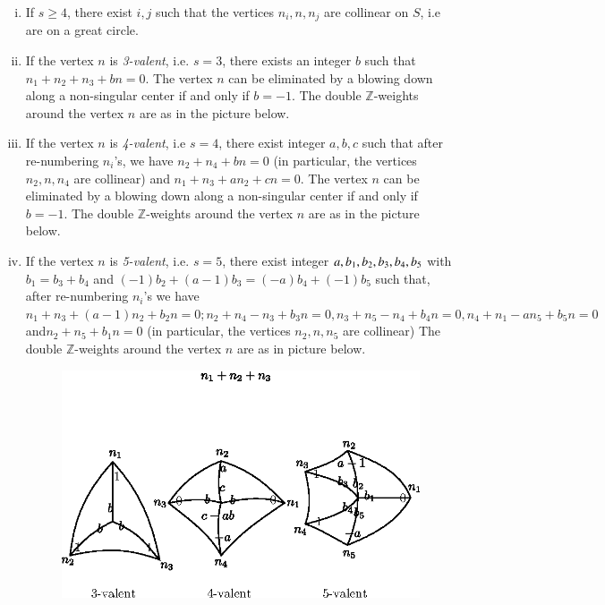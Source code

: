 \begin{enumerate}[(i)]
\item If $ s \ge 4$, there exist $i,j$ such that the vertices $n_i, n,
  n_j$ are collinear on $S$, i.e are on a great circle. 

\item If the vertex $n$ is \textit{3-valent}, i.e. $s=3$, there
  exists an integer $b$ such that $n_1 + n_2 + n_3 + bn=0$. The vertex
  $n$ can be eliminated by a blowing down along a non-singular center
  if and only if $b=-1$. The double $\mathbb{Z}$-weights around the
  vertex $n$ are as in the picture below.    

\item If the vertex $n$ is \textit{4-valent}, i.e $s=4$, there exist
  integer $a,b,c$ such that after re-numbering $n_i$'s, we have $n_2 +
  n_4 + bn = 0$ (in particular, the vertices $n_2, n, n_4$ are
  collinear) and $n_1 + n_3 + an_2 + cn =0$. The vertex $n$ can be
  eliminated by a blowing down along a non-singular center if and only
  if $b=-1$. The double $\mathbb{Z}$-weights  around the vertex $n$
  are as in the picture below. 

\item If the vertex $n$ is \textit{5-valent}, i.e. $s=5$, there
  exist integer $a, b_1, b_2, b_3,\break b_4, b_5$ with $b_1 = b_3 + b_4$
  and $(-1)b_2 + (a-1)b_3 = (-a)b_4 + (-1)b_5$ such that, after
  re-numbering $n_i$'s we have $n_1 + n_3 + (a-1)n_2 + b_2n = 0; n_2 +
  n_4 - n_3 + b_3n = 0 , n_3 + n_5 - n_4 + b_4n = 0, n_4 + n_1- an_5 +
  b_5n = 0$ and\pageoriginale $n_2 + n_5 + b_1n=0$ (in particular, the
  vertices $n_2,   n, n_5$ are collinear) The double
  $\mathbb{Z}$-weights around the vertex $n$ are as in picture below.  
\begin{figure}[H]
\centering 
\includegraphics{vol58-fig/fig58-24.eps} 
\end{figure}

\end{enumerate}


